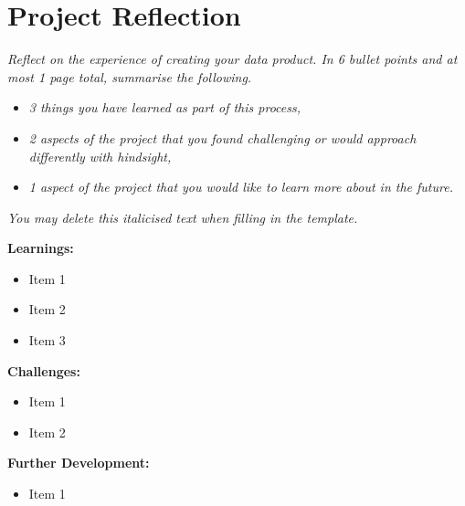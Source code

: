 \documentclass[a4paper, 12pt]{article}
\begin{document}
\pagebreak

\section{Project Reflection}

\textit{Reflect on the experience of creating your data product. In 6 bullet points and at most 1 page total, summarise the following.} 

\begin{itemize}
    \item \textit{3 things you have learned as part of this process,}
    \item \textit{2 aspects of the project that you found challenging or would approach differently with hindsight,} 
    \item \textit{1 aspect of the project that you would like to learn more about in the future.}
\end{itemize}

\textit{You may delete this italicised text when filling in the template.} 

\textbf{Learnings:}

\begin{itemize}
    \item Item 1
    \item Item 2
    \item Item 3
\end{itemize}

\textbf{Challenges:}

\begin{itemize}
    \item Item 1
    \item Item 2
\end{itemize}

\textbf{Further Development:}

\begin{itemize}
    \item Item 1
\end{itemize}
\end{document}
